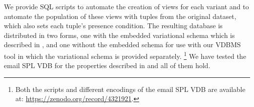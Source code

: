 We provide SQL scripts to automate the creation of views for each
variant%
%
and to automate the population of these views with tuples from the original
dataset,%
which also sets each tuple's presence condition.
%
%
The resulting database is distributed in two forms, one with the embedded
variational schema which is described in ,%
%
%
and one without the embedded schema%
%
for use with our VDBMS tool in which the variational schema is provided
separately.%
\footnote{Both the scripts and different encodings of the email SPL VDB are
available at: \url{https://zenodo.org/record/4321921}.} 
%
We have tested the email SPL VDB for the properties described in  
and all of them hold.

%
%
%
%
